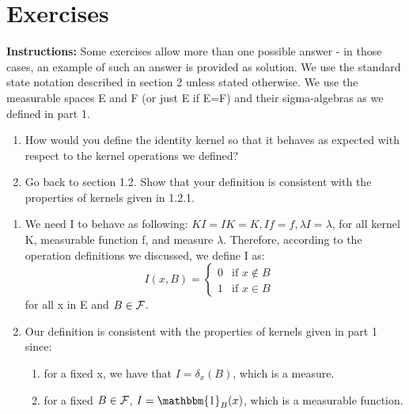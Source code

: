 

\section{Exercises}

\textbf{Instructions:} Some exercises allow more than one possible answer - in those cases, an example of such an answer is provided as solution. We use the standard state notation described in section 2 unless stated otherwise. We use the measurable spaces E and F (or just E if E=F) and their sigma-algebras as we defined in part 1.

\begin{Exercise}
\begin{enumerate}[label=(\alph*)]
\item How would you define the identity kernel so that it behaves as expected with respect to the kernel operations we defined? 
\item Go back to section 1.2. Show that your definition is consistent with the properties of kernels given in 1.2.1.
\end{enumerate}
\end{Exercise}
\begin{Answer}
\begin{enumerate}[label=(\alph*)]
\item We need I to behave as following: $ KI = IK = K, If = f, \lambda I = \lambda $, for all kernel K, measurable function f, and measure $\lambda$. Therefore, according to the operation definitions we discussed, we define I as:
\begin{equation*}
I(x, B) = \begin{cases}
             0  & \text{if } x \not \in B \\
             1  & \text{if } x \in B
       \end{cases} \quad
\end{equation*} for all x in E and $B \in \mathcal{F}$.


\item Our definition is consistent with the properties of kernels given in part 1 since:
\begin{enumerate}[label=(\roman*)]
\item for a fixed x, we have that $I = \delta_x(B)$, which is a measure.
\item for a fixed $B \in \mathcal{F}$, $I = \mathbbm{1}_B(x)$, which is a measurable function.
\end{enumerate}
\end{enumerate}
\end{Answer}


